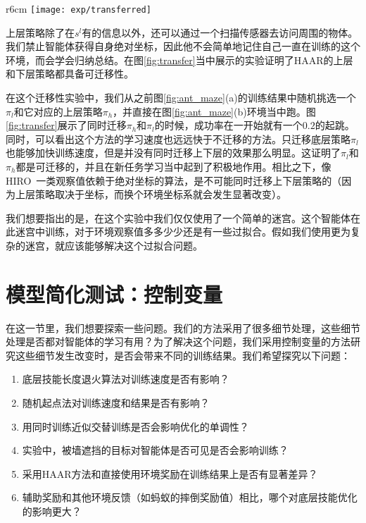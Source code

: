 \begin{wrapfigure}{r}{6cm}
\texttt{[image: exp/transferred]}
\setlength{\belowcaptionskip}{0.0cm}
\caption{在蚂蚁地图环境\ref{fig:exp_overview}(b)中，迁移来自(a)习得的策略。分别是迁移上下层策略，只迁移下层策略，和完全不迁移（即原版HAAR）的学习曲线。}
\label{fig:transfer}
\end{wrapfigure}

上层策略除了在$s^l$有的信息以外，还可以通过一个扫描传感器去访问周围的物体。我们禁止智能体获得自身绝对坐标，因此他不会简单地记住自己一直在训练的这个环境，而会学会归纳总结。在图\ref{fig:transfer}当中展示的实验证明了HAAR的上层和下层策略都具备可迁移性。

在这个迁移性实验中，我们从之前图\ref{fig:ant_maze}(a)的训练结果中随机挑选一个$\pi_l$和它对应的上层策略$\pi_h$，并直接在图\ref{fig:ant_maze}(b)环境当中跑。图\ref{fig:transfer}展示了同时迁移$\pi_h$和$\pi_l$的时候，成功率在一开始就有一个$0.2$的起跳。同时，可以看出这个方法的学习速度也远远快于不迁移的方法。只迁移底层策略$\pi_l$也能够加快训练速度，但是并没有同时迁移上下层的效果那么明显。这证明了$\pi_l$和$\pi_h$都是可迁移的，并且在新任务学习当中起到了积极地作用。相比之下，像HIRO~\cite{HIRO}一类观察值依赖于绝对坐标的算法，是不可能同时迁移上下层策略的（因为上层策略取决于坐标，而换个环境坐标系就会发生显著改变）。

我们想要指出的是，在这个实验中我们仅仅使用了一个简单的迷宫。这个智能体在此迷宫中训练，对于环境观察值多多少少还是有一些过拟合。假如我们使用更为复杂的迷宫，就应该能够解决这个过拟合问题。


\section{模型简化测试：控制变量}
在这一节里，我们想要探索一些问题。我们的方法采用了很多细节处理，这些细节处理是否都对智能体的学习有用？为了解决这个问题，我们采用控制变量的方法研究这些细节发生改变时，是否会带来不同的训练结果。我们希望探究以下问题：
\begin{enumerate}
  \item 底层技能长度退火算法对训练速度是否有影响？
  \item 随机起点法对训练速度和结果是否有影响？
  \item 用同时训练近似交替训练是否会影响优化的单调性？
  \item 实验中，被墙遮挡的目标对智能体是否可见是否会影响训练？
  \item 采用HAAR方法和直接使用环境奖励在训练结果上是否有显著差异？
  \item 辅助奖励和其他环境反馈（如蚂蚁的摔倒奖励值）相比，哪个对底层技能优化的影响更大？
\end{enumerate}

